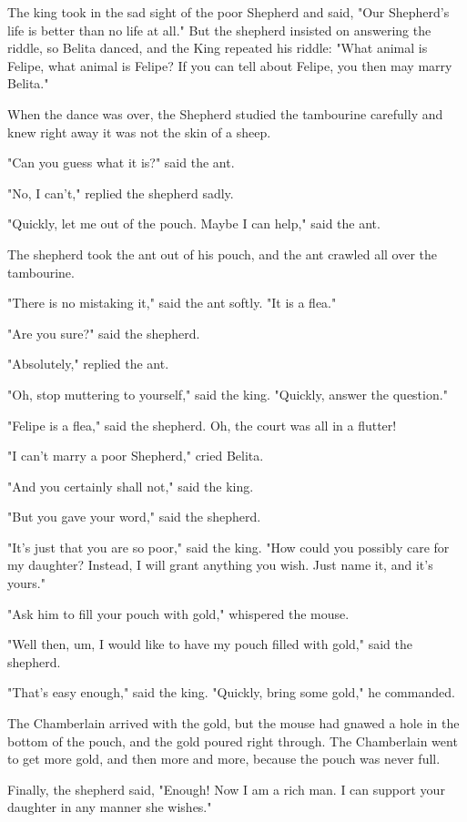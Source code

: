 The king took in the sad sight of the poor Shepherd and said, "Our Shepherd's life is better than no life at all." But the shepherd insisted on answering the riddle, so Belita danced, and the King repeated his riddle: "What animal is Felipe, what animal is Felipe? If you can tell about Felipe, you then may marry Belita."

When the dance was over, the Shepherd studied the tambourine carefully and knew right away it was not the skin of a sheep.

"Can you guess what it is?" said the ant.

"No, I can't," replied the shepherd sadly.

"Quickly, let me out of the pouch. Maybe I can help," said the ant.

The shepherd took the ant out of his pouch, and the ant crawled all over the tambourine.

"There is no mistaking it," said the ant softly. "It is a flea."

"Are you sure?" said the shepherd.

"Absolutely," replied the ant.

"Oh, stop muttering to yourself," said the king. "Quickly, answer the question."

"Felipe is a flea," said the shepherd. Oh, the court was all in a flutter!

"I can't marry a poor Shepherd," cried Belita.

"And you certainly shall not," said the king.

"But you gave your word," said the shepherd.

"It's just that you are so poor," said the king. "How could you possibly care for my daughter? Instead, I will grant anything you wish. Just name it, and it's yours."

"Ask him to fill your pouch with gold," whispered the mouse.

"Well then, um, I would like to have my pouch filled with gold," said the shepherd.

"That's easy enough," said the king. "Quickly, bring some gold," he commanded.

The Chamberlain arrived with the gold, but the mouse had gnawed a hole in the bottom of the pouch, and the gold poured right through. The Chamberlain went to get more gold, and then more and more, because the pouch was never full.

Finally, the shepherd said, "Enough! Now I am a rich man. I can support your daughter in any manner she wishes."

